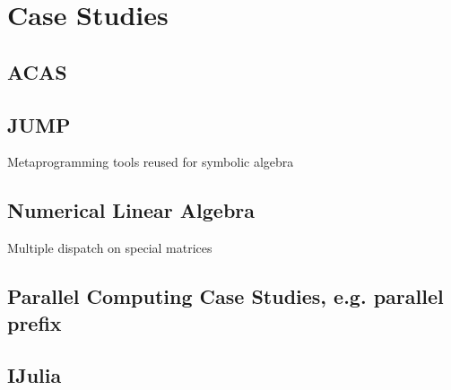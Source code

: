 \chapter{Case Studies}


\section{ACAS}


\section{JUMP}

Metaprogramming tools reused for symbolic algebra


\section{Numerical Linear Algebra}

Multiple dispatch on special matrices


\section{Parallel Computing Case Studies, e.g. parallel prefix}


\section{IJulia}

